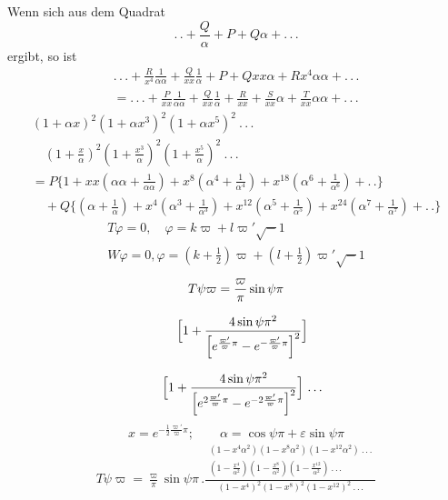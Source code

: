 \noindent Wenn sich aus dem Quadrat
\[
.\,.+\frac{Q}{\alpha}+P+Q\alpha+ .\,.\,.
\]
\noindent ergibt, so ist
\[
\begin{gathered}
.\,.\,.+\frac{R}{x^{4}}\frac1{\alpha\alpha}+\frac{Q}{xx}\frac1\alpha
+P+Qxx\alpha+Rx^{4}\alpha\alpha+ .\,.\,.
\\[7pt]
=.\,.\,.+\frac{P}{xx}\frac1{\alpha\alpha}+\frac{Q}{xx}\frac1\alpha
+\frac{R}{xx}+\frac{S}{xx}\alpha+\frac{T}{xx}\alpha\alpha+ .\,.\,.
\end{gathered}
\]
\[
\begin{gathered}
(1+\alpha x)^{2}(1+\alpha x^{3})^{2}(1+\alpha x^{5})^{2}\ .\,.\,.
\\[7pt]\quad{}(1+\tfrac{x}{\alpha})^{2}(1+\tfrac{x^{3}}{\alpha})^{2}(1+\tfrac{x^{5}}{\alpha})^{2}\ .\,.\,.
\\[7pt]
=P\{1+xx(\alpha\alpha+\tfrac1{\alpha\alpha})
+x^{8}(\alpha^{4}+\tfrac1{\alpha^{4}})
+x^{18}(\alpha^{6}+\tfrac1{\alpha^{6}})+ .\,.\}
\\[7pt]
\quad+Q\{(\alpha+\tfrac1\alpha)
+x^{4}(\alpha^{3}+\tfrac1{\alpha^{3}})
+x^{12}(\alpha^{5}+\tfrac1{\alpha^{5}})
+x^{24}(\alpha^{7}+\tfrac1{\alpha^{7}})+ .\,.\}
\end{gathered}
\]
\[
\begin{gathered}
T\varphi=0,\quad \varphi=k\varpi+l\varpi'\surd-1
\\[7pt]
W\varphi=0, \varphi=(k+\tfrac12)\varpi+(l+\tfrac12)\varpi'\surd-1
\end{gathered}
\]
\[
\begin{gathered}T\psi\varpi=\frac{\varpi}{\pi}\sin\psi\pi
\\[7pt]\quad{}\Bigl[1+\frac{4\sin\psi\pi^{2}}
{\Bigl[e^{\frac{\varpi'}{\varpi}\pi}-e^{-\frac{\varpi'}{\varpi}\pi}\Bigr]^{2}}\Bigr]
\\[7pt]\quad{}\Bigl[1+\frac{4\sin\psi\pi^{2}}
{\Bigl[e^{2\frac{\varpi'}{\varpi}\pi}-e^{-2\frac{\varpi'}{\varpi}\pi}\Bigr]^{2}}\Bigr]\ .\,.\,.\end{gathered}
\]
\[
x=e^{-\frac12\frac{\varpi'}{\varpi}\pi};\qquad
\alpha=\cos\psi\pi+\varepsilon\sin\psi\pi
\]
\[
\begin{gathered}T\psi\varpi=\frac{\varpi}{\pi}\sin\psi\pi\,.
\frac{\begin{gathered}(1-x^{4}\alpha^{2})(1-x^{8}\alpha^{2})(1-x^{12}\alpha^{2})\ .\,.\,.
\\[5pt](1-\frac{x^{4}}{\alpha^{2}})(1-\frac{x^{8}}{\alpha^{2}})(1-\frac{x^{12}}{\alpha^{2}})\ .\,.\,.\end{gathered}}
{(1-x^{4})^{2}(1-x^{8})^{2}(1-x^{12})^{2}\ .\,.\,.}\end{gathered}
\]
